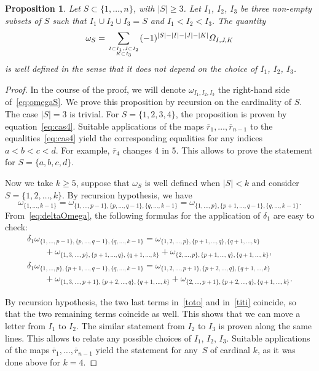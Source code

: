 \documentclass[pdftex]{sigma}
\numberwithin{equation}{section}
\newcommand\atopn[2]{\genfrac{}{}{0pt}{}{#1}{#2}}
\newtheorem{prop}[theo]{Proposition}
\theoremstyle{definition}
\newcommand{\rb}{\overline{r}}
\begin{document}
\begin{prop}
Let $S\subset\{1,\dots,n\}$, with $|S|\geq3$. Let $I_1$, $I_2$, $I_3$ be three non-empty subsets of $S$ such that $I_1\cup I_2\cup I_3= S$ and $I_1<I_2<I_3$.
The quantity
\begin{equation}\label{eq:omegaS}
\omega_{S} = \sum_{\atopn{I\subset I_1, J\subset I_2}{K\subset I_3}} (-1)^{|S|-|I|-|J|-|K|} \varOmega_{I,J,K}
\end{equation}
is well defined in the sense that it does not depend on the choice of $I_1$, $I_2$, $I_3$.
\end{prop}
\begin{proof}
In the course of the proof, we will denote $\omega_{I_1, I_2, I_3}$ the right-hand side of~\eqref{eq:omegaS}.
We prove this proposition by recursion on the cardinality of $S$. The case $|S|=3$ is trivial. For $S=\{1,2,3,4\}$, the proposition is proven by equation~\eqref{eq:cas4}. Suitable applications of the maps $\rb_1,\dots ,\rb_{n-1}$ to the equalities~\eqref{eq:cas4} yield the corresponding equalities for any indices ${a<b<c<d}$. For example, $\rb_4$ changes 4 in 5.
This allows to prove the statement for $S=\{a,b,c,d\}$.

Now we take $k\geq5$, suppose that $\omega_S$ is well defined when $|S|\!<\!k$ and consider ${S\!=\!\{1,2,\dots ,k\}}$.
By recursion hypothesis, we have
\begin{equation*}
\omega_{\{1,\dots,k-1\}}=\omega_{\{1,\dots,p-1\},\{p,\dots,q-1\},\{q,\dots,k-1\}}=\omega_{\{1,\dots,p\},\{p+1,\dots,q-1\},\{q,\dots,k-1\}}.
\end{equation*}
From~\eqref{eq:deltaOmega}, the following formulas for the application of $\delta_1$ are easy to check:{\samepage
\begin{gather}
\delta_1\omega_{\{1,\dots,p-1\},\{p,\dots,q-1\},\{q,\dots,k-1\}} = \omega_{\{1,2,\dots,p\},\{p+1,\dots,q\},\{q+1,\dots,k\}}
\label{tata}\nonumber\\
\qquad{}+\omega_{\{1,3,\dots,p\},\{p+1,\dots,q\},\{q+1,\dots,k\}}+\omega_{\{2,\dots,p\},\{p+1,\dots,q\},\{q+1,\dots,k\}},\label{toto}\\
\delta_1\omega_{\{1,\dots,p\},\{p+1,\dots,q-1\},\{q,\dots ,k-1\}} = \omega_{\{1,2,\dots,p+1\},\{p+2,\dots,q\},\{q+1,\dots,k\}}
\nonumber\label{tutu}\\
\qquad{}+\omega_{\{1,3,\dots,p+1\},\{p+2,\dots,q\},\{q+1,\dots,k\}}+\omega_{\{2,\dots,p+1\},\{p+2,\dots,q\},\{q+1,\dots,k\}}\label{titi}.
\end{gather}}

\noindent
By recursion hypothesis, the two last terms in~\eqref{toto} and in~\eqref{titi} coincide, so that the two remaining terms coincide as well.
This shows that we can move a letter from $I_1$ to $I_2$. The similar statement from $I_2$ to $I_3$ is proven along the same lines.
This allows to relate any possible choices of $I_1$, $I_2$, $I_3$.
Suitable applications of the maps $\rb_1,\dots ,\rb_{n-1}$ yield the statement for any~$S$ of cardinal $k$, as it was done above for $k=4$.
\end{proof}
\end{document}
